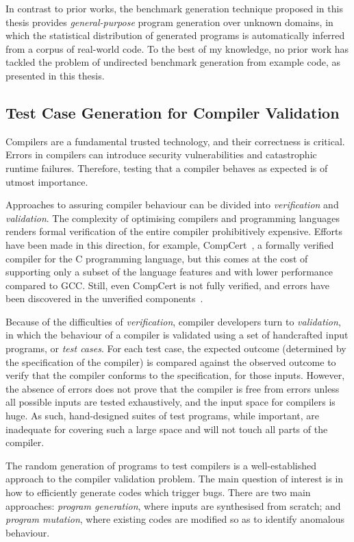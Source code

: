 In contrast to prior works, the benchmark generation technique proposed in this thesis provides \emph{general-purpose} program generation over unknown domains, in which the statistical distribution of generated programs is automatically inferred from a corpus of real-world code. To the best of my knowledge, no prior work has tackled the problem of undirected benchmark generation from example code, as presented in this thesis.


\subsection{Test Case Generation for Compiler Validation}

Compilers are a fundamental trusted technology, and their correctness is critical. Errors in compilers can introduce security vulnerabilities and catastrophic runtime failures. Therefore, testing that a compiler behaves as expected is of utmost importance.

Approaches to assuring compiler behaviour can be divided into \emph{verification} and \emph{validation}. The complexity of optimising compilers and programming languages renders formal verification of the entire compiler prohibitively expensive. Efforts have been made in this direction, for example, CompCert~\cite{Leroy2013}, a formally verified compiler for the C programming language, but this comes at the cost of supporting only a subset of the language features and with lower performance compared to GCC. Still, even CompCert is not fully verified, and errors have been discovered in the unverified components~\cite{Yang2011}.

Because of the difficulties of \emph{verification}, compiler developers turn to \emph{validation}, in which the behaviour of a compiler is validated using a set of handcrafted input programs, or \emph{test cases}. For each test case, the expected outcome (determined by the specification of the compiler) is compared against the observed outcome to verify that the compiler conforms to the specification, for those inputs. However, the absence of errors does not prove that the compiler is free from errors unless all possible inputs are tested exhaustively, and the input space for compilers is huge. As such, hand-designed suites of test programs, while important, are inadequate for covering such a large space and will not touch all parts of the compiler.

The random generation of programs to test compilers is a well-established approach to the compiler validation problem. The main question of interest is in how to efficiently generate codes which trigger bugs. There are two main approaches: \emph{program generation}, where inputs are synthesised from scratch; and \emph{program mutation}, where existing codes are modified so as to identify anomalous behaviour.


